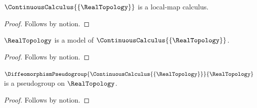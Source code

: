 

\begin{proposition}\label{nominal_chain_calculus}
    $\ContinuousCalculus{\{\RealTopology\}}$ is a local-map calculus.
\end{proposition}
\begin{proof}
    Follows by notion.
\end{proof}

\begin{proposition}\label{nominal_chain_model}
    $\RealTopology$ is a model of $\ContinuousCalculus{\{\RealTopology\}}$.
\end{proposition}
\begin{proof}
    Follows by notion.
\end{proof}

\begin{proposition}\label{nominal_chain_diffeomorphism}
    $\DiffeomorphismPseudogroup{\ContinuousCalculus{\{\RealTopology\}}}{\RealTopology}$
        is a pseudogroup on $\RealTopology$.
\end{proposition}
\begin{proof}
    Follows by notion.
\end{proof}

